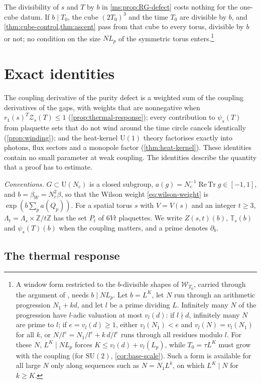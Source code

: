 \documentclass[11pt,a4paper]{amsart}
\theoremstyle{definition}
\theoremstyle{remark}
\numberwithin{equation}{section}
\DeclareMathOperator{\ReTr}{Re\,Tr}  %
\newcommand{\Z}{\mathbb{Z}}          %
\newcommand{\Wwin}{\mathcal{W}}      %
\newcommand{\SU}{\mathrm{SU}}              %
\newcommand{\U}{\mathrm{U}}                %
\newcommand{\TT}{\mathbb{T}}               %
\newcommand{\Zpart}[2]{Z(#1,#2)}           %
\newcommand{\Zc}{\mathcal{Z}}              %
\newcommand{\Zs}[2]{\Zc_{#1}(#2)}          %
\newcommand{\psiT}[2]{\psi_{#1}(#2)}       %
\newcommand{\Vol}[1]{V(#1)}                %
\newcommand{\cube}[1]{(2#1)^3}             %
\newcommand{\Lp}{L_p}                      %
\newcommand{\betaW}{\beta_{W}}             %
\begin{document}
The divisibility of $s$ and $T$ by $b$ in \cref{ms:prop:RG-defect} costs nothing for the one-cube datum. If $b\mid T_0$, the cube $\cube{T_0}$ and the time $T_0$ are divisible by $b$, and \cref{thm:cube-control,thm:ascent} pass from that cube to every torus, divisible by $b$ or not; no condition on the size $N\Lp$ of the symmetric torus enters.\footnote{A window form restricted to the $b$-divisible shapes of $\Wwin_{T_0}$, carried through the argument of \cite[Theorems~7 and~F]{bhattacharjee2026first}, needs $b\mid N\Lp$. Let $b=L^K$, let $N$ run through an arithmetic progression $N_1+kd$, and let $l$ be a prime dividing $L$. Infinitely many $N$ of the progression have $l$-adic valuation at most $v_l(d)$: if $l\nmid d$, infinitely many $N$ are prime to $l$; if $e=v_l(d)\ge1$, either $v_l(N_1)<e$ and $v_l(N)=v_l(N_1)$ for all $k$, or $N/l^e=N_1/l^e+k\,d/l^e$ runs through all residues modulo $l$. For these $N$, $L^K\mid N\Lp$ forces $K\le v_l(d)+v_l(\Lp)$, while $T_0=\tau L^K$ must grow with the coupling (for $\SU(2)$, \cref{cor:base-scale}). Such a form is available for all large $N$ only along sequences such as $N=N_1L^k$, on which $L^K\mid N$ for $k\ge K$.}
\section{Exact identities}\label{sec:identities}

The coupling derivative of the purity defect is a weighted sum of the coupling derivatives of the gaps, with weights that are nonnegative when $r_1(s)^T\Zs{s}{T}\le1$ (\cref{prop:thermal-response}); every contribution to $\psiT{s}{T}$ from plaquette sets that do not wind around the time circle cancels identically (\cref{prop:winding}); and the heat-kernel $\U(1)$ theory factorises exactly into photons, flux sectors and a monopole factor (\cref{thm:heat-kernel}). These identities contain no small parameter at weak coupling. The identities describe the quantity that a proof has to estimate.

\medskip\noindent\textit{Conventions.} $G\subset\U(N_c)$ is a closed subgroup, $a(g)=N_c^{-1}\ReTr g\in[-1,1]$, and $b=\betaW=N_c^2\beta$, so that the Wilson weight \eqref{eq:wilson-weight} is $\exp(b\sum_pa(Q_p))$. For a spatial torus $s$ with $V=\Vol{s}$ and an integer $t\ge3$, $\Lambda_t=\Lambda_s\times\Z/t\Z$ has the set $P_t$ of $6Vt$ plaquettes. We write $\Zpart{s}{t}(b)$, $\TT_s(b)$ and $\psiT{s}{T}(b)$ when the coupling matters, and a prime denotes $\partial_b$.

\subsection{The thermal response}
\end{document}
